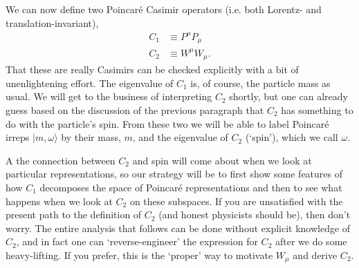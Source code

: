 \documentclass[12pt, oneside]{report}    %
\begin{document}
We can now define two Poincar\'e Casimir operators (i.e. both Lorentz- and translation-invariant),
\begin{align}
  C_1 &\equiv  P^\mu P_\mu\\
  C_2 &\equiv W^\mu W_\mu.
\end{align}
That these are really Casimirs can be checked explicitly with a bit of unenlightening effort.  The eigenvalue of $C_1$ is, of course, the particle mass as usual. We will get to the business of interpreting $C_2$ shortly, but one can already guess based on the discussion of the previous paragraph that $C_2$ has something to do with the particle's spin. From these two we will be able to label Poincar\'e irreps $|m,\omega\rangle$ by their mass, $m$, and the eigenvalue of $C_2$ (`spin'), which we call $\omega$. 

A the connection between $C_2$ and spin will come about when we look at particular representations, so our strategy will be to first show some features of how $C_1$ decomposes the space of Poincar\'e representations and then to see what happens when we look at $C_2$ on these subspaces. If you are unsatisfied with the present path to the definition of $C_2$ (and honest physicists should be), then don't worry. The entire analysis that follows can be done without explicit knowledge of $C_2$, and in fact one can `reverse-engineer' the expression for $C_2$ after we do some heavy-lifting. If you prefer, this is the `proper' way to motivate $W_\mu$ and derive $C_2$.

\end{document}

